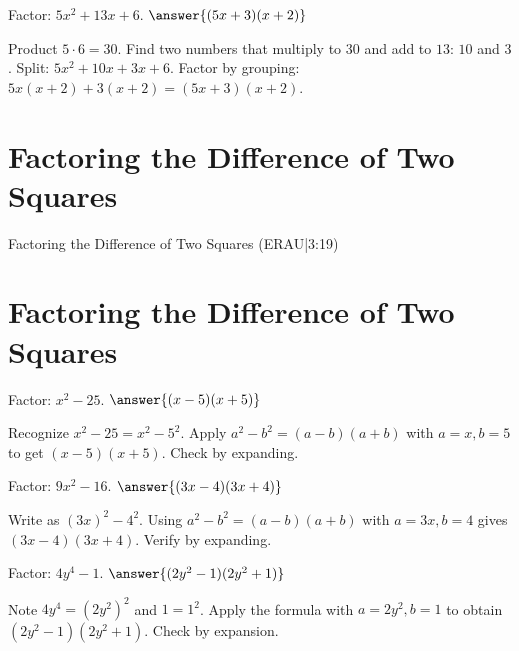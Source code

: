 \documentclass{ximera}
\begin{document}
\begin{problem}
Factor: \(5x^2 + 13x + 6\). $\answer{(5x+3)(x+2)}$
\begin{feedback}
Product \(5\cdot6=30\). Find two numbers that multiply to \(30\) and add to \(13\): \(10\) and \(3\). Split: \(5x^2+10x+3x+6\). Factor by grouping: \(5x(x+2)+3(x+2)=(5x+3)(x+2)\).
\end{feedback}
\end{problem}


\section*{Factoring the Difference of Two Squares}

Factoring the Difference of Two Squares (ERAU|3:19)



\section*{Factoring the Difference of Two Squares}

\begin{problem}
Factor: \(x^2 - 25\). $\answer{(x-5)(x+5)}$
\begin{feedback}
Recognize \(x^2-25 = x^2-5^2\). Apply \(a^2-b^2=(a-b)(a+b)\) with \(a=x,b=5\) to get \((x-5)(x+5)\). Check by expanding.
\end{feedback}
\end{problem}

\begin{problem}
Factor: \(9x^2 - 16\). $\answer{(3x-4)(3x+4)}$
\begin{feedback}
Write as \((3x)^2-4^2\). Using \(a^2-b^2=(a-b)(a+b)\) with \(a=3x,b=4\) gives \((3x-4)(3x+4)\). Verify by expanding.
\end{feedback}
\end{problem}

\begin{problem}
Factor: \(4y^4 - 1\). $\answer{(2y^2-1)(2y^2+1)}$
\begin{feedback}
Note \(4y^4=(2y^2)^2\) and \(1=1^2\). Apply the formula with \(a=2y^2,b=1\) to obtain \((2y^2-1)(2y^2+1)\). Check by expansion.
\end{feedback}
\end{problem}

\end{document}
